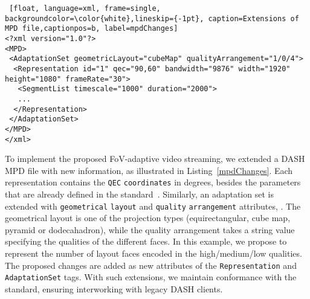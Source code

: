 \begin{lstlisting} [float, language=xml, frame=single, backgroundcolor=\color{white},lineskip={-1pt}, caption=Extensions of MPD file,captionpos=b, label=mpdChanges]
<?xml version="1.0"?>
<MPD>
 <AdaptationSet geometricLayout="cubeMap" qualityArrangement="1/0/4">
  <Representation id="1" qec="90,60" bandwidth="9876" width="1920" height="1080" frameRate="30">
   <SegmentList timescale="1000" duration="2000">
   ...
  </Representation>
 </AdaptationSet>
</MPD>
</xml>
\end{lstlisting}

 To implement the proposed
\ac{FoV}-adaptive video streaming, we extended a \ac{DASH} \ac{MPD}
file with new information, as illustrated in Listing~\ref{mpdChanges}.
Each representation contains the \texttt{\ac{QEC}}
\texttt{coordinates} in degrees, besides the parameters that are
already defined in the standard~\cite{iso_iec}. Similarly, an
adaptation set is extended with \texttt{geometrical} \texttt{layout}
and \texttt{quality} \texttt{arrangement} attributes, .
The geometrical layout is one
of the projection types (equirectangular, cube map, pyramid or
dodecahadron), while the quality arrangement takes a string value
specifying the qualities of the different faces. In this example, we
propose to represent the number of layout faces encoded in the
high/medium/low qualities. The proposed changes are added as new
attributes of the \texttt{Representation} and \texttt{AdaptationSet}
tags. With such extensions, we maintain conformance with the standard,
ensuring interworking with legacy \ac{DASH} clients.
